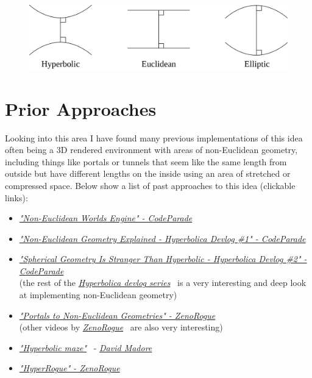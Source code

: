\documentclass[]{article}
\begin{document}
        \begin{figure}[h!]
            \centering
            \includegraphics[scale=0.15]{noneuclid.png}
        \end{figure}    
    
    \section{Prior Approaches}
        Looking into this area I have found many previous implementations of this idea often being a 3D rendered environment 
        with areas of non-Euclidean geometry, including things like portals or tunnels that seem like the same length from 
        outside but have different lengths on the inside using an area of stretched or compressed space.
        Below show a list of past approaches to this idea (clickable links):
        \begin{itemize}
            \item \href{https://www.youtube.com/watch?v=kEB11PQ9Eo8}{\textit{"Non-Euclidean Worlds Engine" - CodeParade}}~\cite{CodeParade2018}
            \item \href{https://www.youtube.com/watch?v=zQo_S3yNa2w}{\textit{"Non-Euclidean Geometry Explained - Hyperbolica Devlog \#1" - CodeParade}}~\cite{CodeParade2020a}
            \item \href{https://www.youtube.com/watch?v=yY9GAyJtuJ0}{\textit{"Spherical Geometry Is Stranger Than Hyperbolic - Hyperbolica Devlog \#2" - CodeParade}}~\cite{CodeParade2020b} \\ 
                (the rest of the \href{https://www.youtube.com/playlist?list=PLh9DXIT3m6N4qJK9GKQB3yk61tVe6qJvA}{\textit{Hyperbolica devlog series}}~\cite{CodeParade2022}
                is a very interesting and deep look at implementing non-Euclidean geometry)
            \item \href{https://www.youtube.com/watch?v=yqUv2JO2BCs}{\textit{"Portals to Non-Euclidean Geometries" - ZenoRogue}}~\cite{Portals}\\
                (other videos by \href{https://www.youtube.com/@ZenoRogue}{\textit{ZenoRogue}}~\cite{ZenoChannel} are also very interesting) 
            \item \href{http://www.madore.org/~david/math/hyperbolic-maze.html#explanations}{\textit{"Hyperbolic maze"}}~\cite{Madore2016} - 
                \href{http://www.madore.org/~david/}{\textit{David Madore}}~\cite{Madore2023}
            \item \href{https://www.roguetemple.com/z/hyper/}{\textit{"HyperRogue" - ZenoRogue}}~\cite{ZenoRogue2023}
        \end{itemize}
\end{document}
